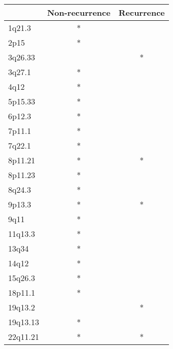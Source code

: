 \begin{tabular}{lcc}
\toprule
{} & Non-recurrence & Recurrence \\
\midrule
1q21.3   &              * &            \\
2p15     &              * &            \\
3q26.33  &                &          * \\
3q27.1   &              * &            \\
4q12     &              * &            \\
5p15.33  &              * &            \\
6p12.3   &              * &            \\
7p11.1   &              * &            \\
7q22.1   &              * &            \\
8p11.21  &              * &          * \\
8p11.23  &              * &            \\
8q24.3   &              * &            \\
9p13.3   &              * &          * \\
9q11     &              * &            \\
11q13.3  &              * &            \\
13q34    &              * &            \\
14q12    &              * &            \\
15q26.3  &              * &            \\
18p11.1  &              * &            \\
19q13.2  &                &          * \\
19q13.13 &              * &            \\
22q11.21 &              * &          * \\
\bottomrule
\end{tabular}
